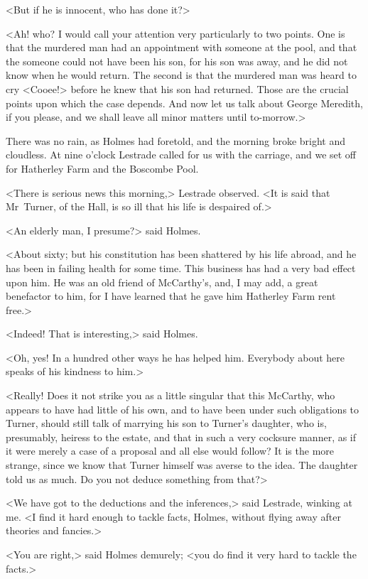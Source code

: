 <But if he is innocent, who has done it?>

<Ah! who? I would call your attention very particularly to two points. One is that the murdered man had an appointment with someone at the pool, and that the someone could not have been his son, for his son was away, and he did not know when he would return. The second is that the murdered man was heard to cry <Cooee!> before he knew that his son had returned. Those are the crucial points upon which the case depends. And now let us talk about George Meredith, if you please, and we shall leave all minor matters until to-morrow.>

There was no rain, as Holmes had foretold, and the morning broke bright and cloudless. At nine o'clock Lestrade called for us with the carriage, and we set off for Hatherley Farm and the Boscombe Pool.

<There is serious news this morning,> Lestrade observed. <It is said that Mr~Turner, of the Hall, is so ill that his life is despaired of.>

<An elderly man, I presume?> said Holmes.

<About sixty; but his constitution has been shattered by his life abroad, and he has been in failing health for some time. This business has had a very bad effect upon him. He was an old friend of McCarthy's, and, I may add, a great benefactor to him, for I have learned that he gave him Hatherley Farm rent free.>

<Indeed! That is interesting,> said Holmes.

<Oh, yes! In a hundred other ways he has helped him. Everybody about here speaks of his kindness to him.>

<Really! Does it not strike you as a little singular that this McCarthy, who appears to have had little of his own, and to have been under such obligations to Turner, should still talk of marrying his son to Turner's daughter, who is, presumably, heiress to the estate, and that in such a very cocksure manner, as if it were merely a case of a proposal and all else would follow? It is the more strange, since we know that Turner himself was averse to the idea. The daughter told us as much. Do you not deduce something from that?>

<We have got to the deductions and the inferences,> said Lestrade, winking at me. <I find it hard enough to tackle facts, Holmes, without flying away after theories and fancies.>

<You are right,> said Holmes demurely; <you do find it very hard to tackle the facts.>

